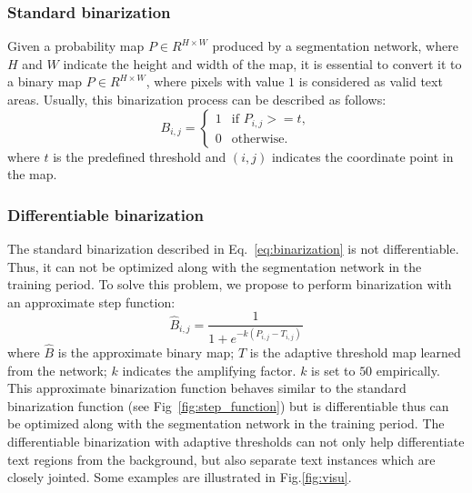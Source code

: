 \documentclass[letterpaper]{article} %
\begin{document}
\subsubsection{Standard binarization}
Given a probability map $P \in R^{H \times W}$ produced by a segmentation network, where $H$ and $W$ indicate the height and width of the map, it is essential to convert it to a binary map $P \in R^{H \times W}$, where pixels with value $1$ is considered as valid text areas. Usually, this binarization process can be described as follows:
\begin{equation}
    B_{i, j}=
    \begin{cases}
        1& \text{if } P_{i, j} >= t, \\
        0&  \text{otherwise.}
    \end{cases}
    \label{eq:binarization}
\end{equation}
where $t$ is the predefined threshold and $(i, j)$ indicates the coordinate point in the map.

\subsubsection{Differentiable binarization}
The standard binarization described in Eq.~\ref{eq:binarization} is not differentiable. Thus, it can not be optimized along with the segmentation network in the training period. To solve this problem, we propose to perform binarization with an approximate step function:
\begin{equation}
    \hat{B}_{i, j}=\frac{1}{1+e^{-k (P_{i, j} - T_{i, j})}}
    \label{eq:db}
\end{equation}
where $\hat{B}$ is the approximate binary map; $T$ is the adaptive threshold map learned from the network; $k$ indicates the amplifying factor. $k$ is set to $50$ empirically. 
This approximate binarization function behaves similar to the standard binarization function (see Fig~\ref{fig:step_function}) but is differentiable thus can be optimized along with the segmentation network in the training period.
The differentiable binarization with adaptive thresholds can not only help differentiate text regions from the background, but also separate text instances which are closely jointed. Some examples are illustrated in Fig.\ref{fig:visu}.
\end{document}
